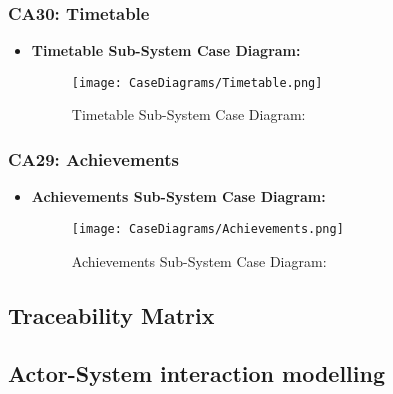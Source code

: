 \documentclass[12pt,a4paper]{article}
\begin{document}
		\subsubsection{CA30: Timetable}
			\begin{itemize}
				\item \textbf{Timetable Sub-System Case Diagram:}
				\begin{figure}[H]
					\texttt{[image: CaseDiagrams/Timetable.png]}
					\caption{Timetable Sub-System Case Diagram:}
				\end{figure}
			\end{itemize}
		\subsubsection{CA29: Achievements}
			\begin{itemize}
				\item \textbf{Achievements Sub-System Case Diagram:}
				\begin{figure}[H]
					\texttt{[image: CaseDiagrams/Achievements.png]}
					\caption{Achievements Sub-System Case Diagram:}
				\end{figure}
			\end{itemize}
	\subsection{Traceability Matrix}
	\subsection{Actor-System interaction modelling}
\end{document}
